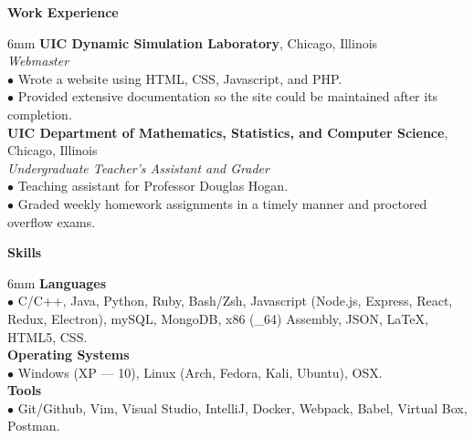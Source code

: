 \documentclass[11pt]{article}
\newcommand{\sectionheader}[1]{\noindent \textbf{\large #1}}
\newenvironment{sectionbody}{\begin{adjustwidth}{6mm}{}}{\end{adjustwidth}}
\begin{document}
\sectionheader{Work Experience}
\begin{sectionbody}
{\bf UIC Dynamic Simulation Laboratory}, Chicago, Illinois \\
\textit{Webmaster} \\
$\bullet$ Wrote a website using HTML, CSS, Javascript, and PHP.\@ \\
$\bullet$ Provided extensive documentation so the site could be maintained after its completion. \\
{\bf UIC Department of Mathematics, Statistics, and Computer Science}, Chicago, Illinois \\
\textit{Undergraduate Teacher's Assistant and Grader} \\
$\bullet$ Teaching assistant for Professor Douglas Hogan. \\
$\bullet$ Graded weekly homework assignments in a timely manner and proctored overflow exams.
\end{sectionbody}

\sectionheader{Skills}
\begin{sectionbody}
{\bf Languages} \\
$\bullet$ C/C++, Java, Python, Ruby, Bash/Zsh, Javascript (Node.js, Express, React, Redux, Electron), mySQL, MongoDB, x86 (\_64) Assembly, JSON, \LaTeX, HTML5, CSS.\@ \\
{\bf Operating Systems} \\
$\bullet$ Windows (XP --- 10), Linux (Arch, Fedora, Kali, Ubuntu), OSX.\@ \\
{\bf Tools} \\
$\bullet$ Git/Github, Vim, Visual Studio, IntelliJ, Docker, Webpack, Babel, Virtual Box, Postman.
\end{sectionbody}
\end{document}
